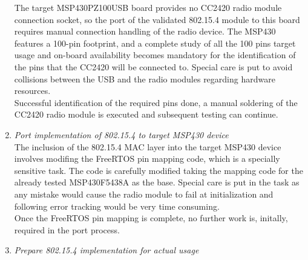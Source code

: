 \begin{enumerate}
		The target MSP430PZ100USB board provides no CC2420 radio module connection socket, so the port of the validated 802.15.4 module to this board requires manual connection handling of the radio device. The MSP430 features a 100-pin footprint, and a complete study of all the 100 pins target usage and on-board availability becomes mandatory for the identification of the pins that the CC2420 will be connected to. Special care is put to avoid collisions between the USB and the radio modules regarding hardware resources.\\

		Successful identification of the required pins done, a manual soldering of the CC2420 radio module is executed  and subsequent testing can continue.\\

		\item\emph{Port implementation of 802.15.4 to target MSP430 device}\\

		The inclusion of the 802.15.4 MAC layer into the target MSP430 device involves modifing the FreeRTOS pin mapping code, which is a specially sensitive task. The code is carefully modified taking the mapping code for the already tested MSP430F5438A as the base. Special care is put in the task as any mistake would cause the radio module to fail at initialization and following error tracking would be very time consuming. \\

		Once the FreeRTOS pin mapping is complete, no further work is, initally, required in the port process.\\

		\item\emph{Prepare 802.15.4 implementation for actual usage}\\



\end{enumerate}
